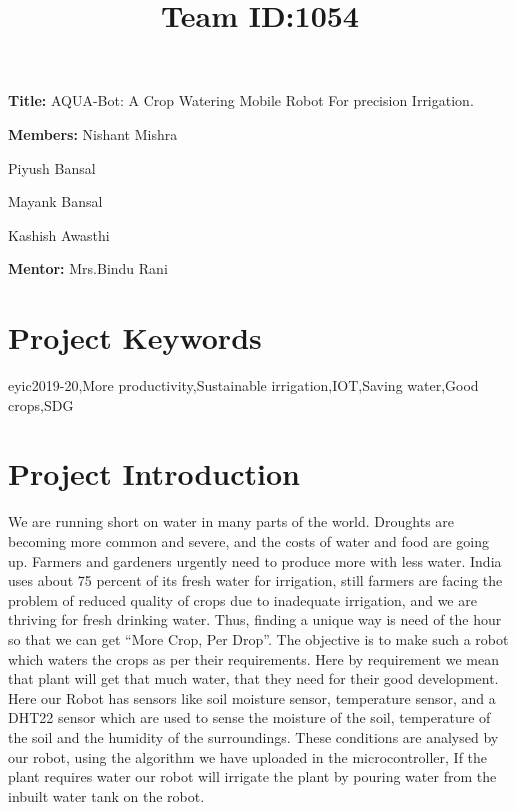 \documentclass[dvips,12pt]{article}
\title{\bf Team ID:1054}
\author{}
\date{}
\newcommand{\namelistlabel}[1]{\mbox{#1}\hfil}
\newenvironment{namelist}[1]{%
\begin{list}{}
    {
        \let\makelabel\namelistlabel
        \settowidth{\labelwidth}{#1}
        \setlength{\leftmargin}{1.1\labelwidth}
    }
  }{
\end{list}}
\begin{document}
\maketitle

\begin{namelist}{xxxxxxxxxxxx}
\item[{\bf Title:}]
	AQUA-Bot: A Crop Watering Mobile Robot For precision
Irrigation.
\item[{\bf Members:}]
	Nishant Mishra
	\item Piyush Bansal
	\item Mayank Bansal
	\item Kashish Awasthi
\item[{\bf Mentor:}]
	Mrs.Bindu Rani
\end{namelist}


\section*{Project Keywords} eyic2019-20,More productivity,Sustainable irrigation,IOT,Saving water,Good crops,SDG


\section*{Project Introduction} We are running short on water in many parts of the world. Droughts are becoming more common and
severe, and the costs of water and food are going up. Farmers and gardeners urgently need to produce more
with less water. India uses about 75 percent of its fresh water for irrigation, still farmers are facing the problem of
reduced quality of crops due to inadequate irrigation, and we are thriving for fresh drinking water. Thus,
finding a unique way is need of the hour so that we can get “More Crop, Per Drop”. The objective is to make
such a robot which waters the crops as per their requirements. Here by requirement we mean that plant will
get that much water, that they need for their good development. Here our Robot has sensors like soil
moisture sensor, temperature sensor, and a DHT22 sensor which are used to sense the moisture of the soil,
temperature of the soil and the humidity of the surroundings. These conditions are analysed by our robot,
using the algorithm we have uploaded in the microcontroller, If the plant requires water our robot will
irrigate the plant by pouring water from the inbuilt water tank on the robot.
\end{document}
